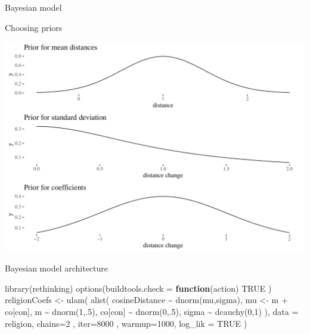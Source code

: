 \documentclass[
  10pt,
  ignorenonframetext,
  x11names, dvipsnames, bibspacing,natbib]{beamer}
\newenvironment{Shaded}{\begin{snugshade}}{\end{snugshade}}
\newcommand{\AttributeTok}[1]{\textcolor[rgb]{0.77,0.63,0.00}{#1}}
\newcommand{\ConstantTok}[1]{\textcolor[rgb]{0.00,0.00,0.00}{#1}}
\newcommand{\ControlFlowTok}[1]{\textcolor[rgb]{0.13,0.29,0.53}{\textbf{#1}}}
\newcommand{\DecValTok}[1]{\textcolor[rgb]{0.00,0.00,0.81}{#1}}
\newcommand{\FunctionTok}[1]{\textcolor[rgb]{0.00,0.00,0.00}{#1}}
\newcommand{\NormalTok}[1]{#1}
\newcommand{\OtherTok}[1]{\textcolor[rgb]{0.56,0.35,0.01}{#1}}
\newcommand{\SpecialCharTok}[1]{\textcolor[rgb]{0.00,0.00,0.00}{#1}}
\begin{document}
\begin{frame}{Bayesian model}
\protect\hypertarget{bayesian-model}{}
\begin{block}{Choosing priors}
\protect\hypertarget{choosing-priors}{}
\begin{center}\includegraphics[width=1\linewidth]{presentationBoston_files/figure-beamer/priorsVis-1} \end{center}
\end{block}
\end{frame}

\begin{frame}[fragile]{Bayesian model architecture}
\protect\hypertarget{bayesian-model-architecture}{}
\vspace{1mm}
\footnotesize

\begin{Shaded}
\begin{Highlighting}[]
\FunctionTok{library}\NormalTok{(rethinking)}
\FunctionTok{options}\NormalTok{(}\AttributeTok{buildtools.check =} \ControlFlowTok{function}\NormalTok{(action) }\ConstantTok{TRUE}\NormalTok{ )}
\NormalTok{religionCoefs }\OtherTok{\textless{}{-}} \FunctionTok{ulam}\NormalTok{(}
  \FunctionTok{alist}\NormalTok{(}
\NormalTok{    cosineDistance }\SpecialCharTok{\textasciitilde{}} \FunctionTok{dnorm}\NormalTok{(mu,sigma),}
\NormalTok{    mu }\OtherTok{\textless{}{-}}\NormalTok{ m }\SpecialCharTok{+}\NormalTok{ co[con],}
\NormalTok{    m }\SpecialCharTok{\textasciitilde{}} \FunctionTok{dnorm}\NormalTok{(}\DecValTok{1}\NormalTok{,.}\DecValTok{5}\NormalTok{),}
\NormalTok{    co[con] }\SpecialCharTok{\textasciitilde{}} \FunctionTok{dnorm}\NormalTok{(}\DecValTok{0}\NormalTok{,.}\DecValTok{5}\NormalTok{),}
\NormalTok{    sigma }\SpecialCharTok{\textasciitilde{}} \FunctionTok{dcauchy}\NormalTok{(}\DecValTok{0}\NormalTok{,}\DecValTok{1}\NormalTok{)}
\NormalTok{  ),}
  \AttributeTok{data =}\NormalTok{ religion,}
  \AttributeTok{chains=}\DecValTok{2}\NormalTok{ , }\AttributeTok{iter=}\DecValTok{8000}\NormalTok{ , }\AttributeTok{warmup=}\DecValTok{1000}\NormalTok{, }
  \AttributeTok{log\_lik =} \ConstantTok{TRUE}
\NormalTok{)}
\end{Highlighting}
\end{Shaded}

\normalsize
\end{frame}
\end{document}
